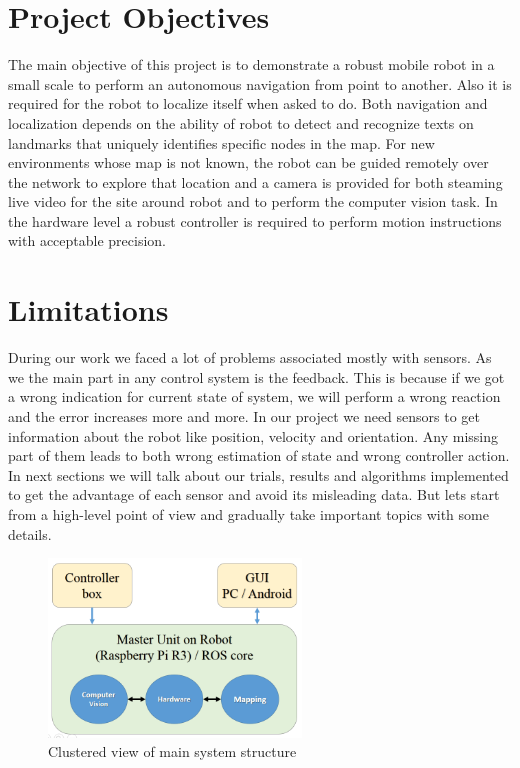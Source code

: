 \documentclass[12pt]{book}
\begin{document}
\section{Project Objectives}
The main objective of this project is to demonstrate a robust mobile robot in a small scale to perform an autonomous navigation from point to another. Also it is required for the robot to localize itself when asked to do. Both navigation and localization depends on the ability of robot to detect and recognize texts on landmarks that uniquely identifies specific nodes in the map.
For new environments whose map is not known, the robot can be guided remotely over the network to explore that location and a camera is provided for both steaming live video for the site around robot and to perform the computer vision task.
In the hardware level a robust controller is required to perform motion instructions with acceptable precision.


\section{Limitations}
During our work we faced a lot of problems associated mostly with sensors. As we the main part in any control system is the feedback. This is because if we got a wrong indication for current state of system, we will perform a wrong reaction and the error increases more and more. In our project we need sensors to get information about the robot like position, velocity and orientation. Any missing part of them leads to both wrong estimation of state and wrong controller action.
In next sections we will talk about our trials, results and algorithms implemented to get the advantage of each sensor and avoid its misleading data.
\noindent But lets start from a high-level point of view and gradually take important topics with some details.

\begin{figure}
	\centering
	\includegraphics[width =0.6\textwidth]{Fig/overview.png}
	\caption{Clustered view of main system structure}
	\label{fig:system-structure}
\end{figure}
\end{document}
